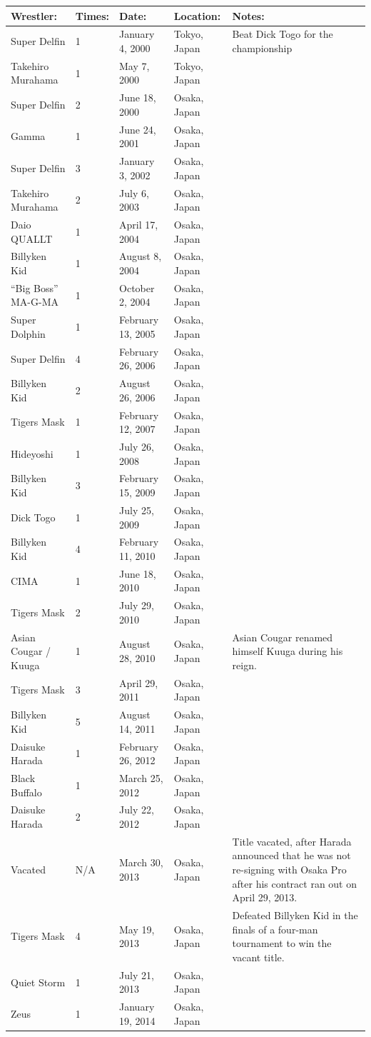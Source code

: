 \documentclass{article}
\begin{document}
\begin{tabular}{lllll}
\toprule
Wrestler: & Times: & Date: & Location: & Notes: \\
\midrule
Super Delfin & 1 & January 4, 2000 & Tokyo, Japan & Beat Dick Togo for the championship \\
Takehiro Murahama & 1 & May 7, 2000 & Tokyo, Japan &  \\
Super Delfin & 2 & June 18, 2000 & Osaka, Japan &  \\
Gamma & 1 & June 24, 2001 & Osaka, Japan &  \\
Super Delfin & 3 & January 3, 2002 & Osaka, Japan &  \\
Takehiro Murahama & 2 & July 6, 2003 & Osaka, Japan &  \\
Daio QUALLT & 1 & April 17, 2004 & Osaka, Japan &  \\
Billyken Kid & 1 & August 8, 2004 & Osaka, Japan &  \\
“Big Boss” MA-G-MA & 1 & October 2, 2004 & Osaka, Japan &  \\
Super Dolphin & 1 & February 13, 2005 & Osaka, Japan &  \\
Super Delfin & 4 & February 26, 2006 & Osaka, Japan &  \\
Billyken Kid & 2 & August 26, 2006 & Osaka, Japan &  \\
Tigers Mask & 1 & February 12, 2007 & Osaka, Japan &  \\
Hideyoshi & 1 & July 26, 2008 & Osaka, Japan &  \\
Billyken Kid & 3 & February 15, 2009 & Osaka, Japan &  \\
Dick Togo & 1 & July 25, 2009 & Osaka, Japan &  \\
Billyken Kid & 4 & February 11, 2010 & Osaka, Japan &  \\
CIMA & 1 & June 18, 2010 & Osaka, Japan &  \\
Tigers Mask & 2 & July 29, 2010 & Osaka, Japan &  \\
Asian Cougar / Kuuga & 1 & August 28, 2010 & Osaka, Japan & Asian Cougar renamed himself Kuuga during his reign. \\
Tigers Mask & 3 & April 29, 2011 & Osaka, Japan &  \\
Billyken Kid & 5 & August 14, 2011 & Osaka, Japan &  \\
Daisuke Harada & 1 & February 26, 2012 & Osaka, Japan &  \\
Black Buffalo & 1 & March 25, 2012 & Osaka, Japan &  \\
Daisuke Harada & 2 & July 22, 2012 & Osaka, Japan &  \\
Vacated & N/A & March 30, 2013 & Osaka, Japan & Title vacated, after Harada announced that he was not re-signing with Osaka Pro after his contract ran out on April 29, 2013. \\
Tigers Mask & 4 & May 19, 2013 & Osaka, Japan & Defeated Billyken Kid in the finals of a four-man tournament to win the vacant title. \\
Quiet Storm & 1 & July 21, 2013 & Osaka, Japan &  \\
Zeus & 1 & January 19, 2014 & Osaka, Japan &  \\
\bottomrule
\end{tabular}
\end{document}
